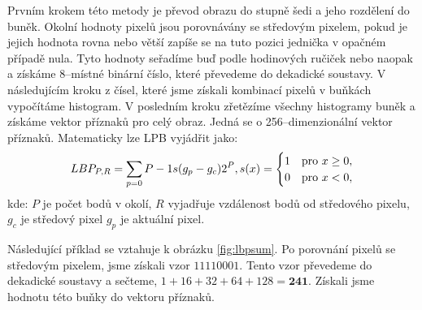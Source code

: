 Prvním krokem této metody je převod obrazu do stupně šedi a jeho rozdělení do buněk. Okolní hodnoty pixelů jsou porovnávány se středovým pixelem, pokud je jejich hodnota rovna nebo větší zapíše se na tuto pozici jednička v opačném případě nula. Tyto hodnoty seřadíme buď podle hodinových ručiček nebo naopak a získáme 8--místné binární číslo, které převedeme do dekadické soustavy. V následujícím kroku z čísel, které jsme získali kombinací pixelů v buňkách vypočítáme histogram. V posledním kroku zřetězíme všechny histogramy buněk a získáme vektor příznaků pro celý obraz. Jedná se o 256--dimenzionální vektor příznaků. 
Matematicky lze LPB vyjádřit jako:
\begin{equation*}
LBP_{P,R} = \sum_{p=0}{P-1} s(g_p - g_c)2^P, \\
s(x) =
  \begin{cases} 
   1 & \text{pro } x \geq 0, \\
   0       & \text{pro } x < 0,
  \end{cases}
\end{equation*}
kde: $P$ je počet bodů v okolí, $R$ vyjadřuje vzdálenost bodů od středového pixelu, $g_c$ je středový pixel $g_p$ je aktuální pixel. 

Následující příklad se vztahuje k obrázku \ref{fig:lbpsum}. Po porovnání pixelů se středovým pixelem, jsme získali vzor $11110001$. Tento vzor převedeme do dekadické soustavy a sečteme, $ 1+16+32+64+128 = \textbf{241}$. Získali jsme hodnotu této buňky do vektoru příznaků.

